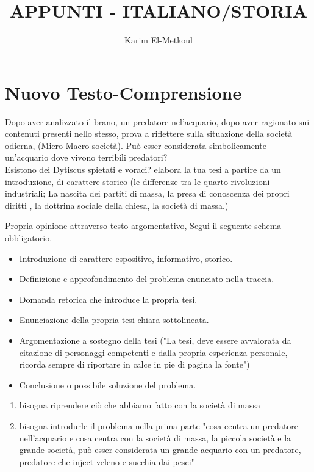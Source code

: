 \documentclass{article}
\title{APPUNTI - ITALIANO/STORIA}
\author{Karim El-Metkoul}
\begin{document}
\maketitle

\section{Nuovo Testo-Comprensione}
Dopo aver analizzato il brano, un predatore nel'acquario, dopo aver ragionato sui contenuti
 presenti nello stesso, prova a riflettere sulla situazione della società odierna, (Micro-Macro società).
Può esser considerata simbolicamente un'acquario dove vivono terribili predatori?
\\Esistono dei Dytiscus spietati e voraci?
elabora la tua tesi a partire da un introduzione, di carattere storico (le differenze tra le quarto rivoluzioni industriali; La nascita dei partiti di massa, la presa di conoscenza dei propri diritti , la dottrina sociale della chiesa, la società di massa.)

Propria opinione attraverso testo argomentativo, Segui il seguente schema obbligatorio.\\

\graphicspath{ {image.png} }

\begin{itemize}
    \item Introduzione di carattere espositivo, informativo, storico.
    \item Definizione e approfondimento del problema enunciato nella traccia.
    \item Domanda retorica che introduce la propria tesi. 
    \item Enunciazione della propria tesi chiara sottolineata.
    \item Argomentazione a sostegno della tesi ("La tesi, deve essere avvalorata da citazione di personaggi competenti e dalla propria esperienza personale, ricorda sempre di riportare in calce 
    in pie di pagina la fonte")
    \item Conclusione o possibile soluzione del problema.

\end{itemize}   

\begin{enumerate}
  \item bisogna riprendere ciò che abbiamo fatto con la società di massa
  \item bisogna introdurle il problema nella prima parte "cosa centra un predatore nell'acquario e cosa centra con la società di massa,
  la piccola società e la grande società, può esser considerata un grande acquario con un predatore,
  predatore che inject veleno e succhia dai pesci" 
\end{enumerate}
\end{document}
